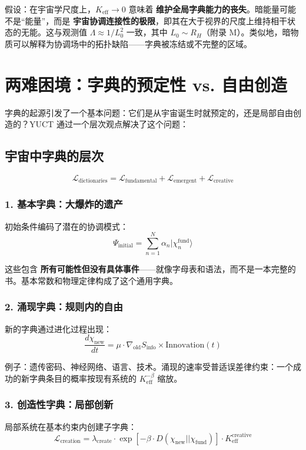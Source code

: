 \documentclass[12pt,a4paper]{article}
\newcommand{\eff}{\mathrm{eff}}
\newcommand{\Ke}{K_{\eff}}
\begin{document}
	假设：在宇宙学尺度上，$\Ke \to 0$ 意味着 \textbf{维护全局字典能力的丧失}。暗能量可能不是“能量”，而是 \textbf{宇宙协调连接性的极限}，即其在大于视界的尺度上维持相干状态的无能。这与观测值 $\Lambda \approx 1/L_0^2$ 一致，其中 $L_0 \sim R_H$（附录 M）。类似地，暗物质可以解释为协调场中的拓扑缺陷——字典被冻结或不完整的区域。
	
	\section{两难困境：字典的预定性 vs. 自由创造}
	
	字典的起源引发了一个基本问题：它们是从宇宙诞生时就预定的，还是局部自由创造的？YUCT 通过一个层次观点解决了这个问题：
	
	\subsection{宇宙中字典的层次}
	
	\[
	\mathcal{L}_{\text{dictionaries}} = \mathcal{L}_{\text{fundamental}} + \mathcal{L}_{\text{emergent}} + \mathcal{L}_{\text{creative}}
	\]
	
	\subsubsection{1. 基本字典：大爆炸的遗产}
	
	初始条件编码了潜在的协调模式：
	\[
	\Psi_{\text{initial}} = \sum_{n=1}^N \alpha_n |\chi_n^{\text{fund}}\rangle
	\]
	
	这些包含 \textbf{所有可能性但没有具体事件}——就像字母表和语法，而不是一本完整的书。基本常数和物理定律构成了这个通用字典。
	
	\subsubsection{2. 涌现字典：规则内的自由}
	
	新的字典通过进化过程出现：
	\[
	\frac{d\chi_{\text{new}}}{dt} = \mu \cdot \nabla_{\text{old}} S_{\text{info}} \times \text{Innovation}(t)
	\]
	
	例子：遗传密码、神经网络、语言、技术。涌现的速率受普适误差律约束：一个成功的新字典条目的概率按现有系统的 $\Ke^{-\beta}$ 缩放。
	
	\subsubsection{3. 创造性字典：局部创新}
	
	局部系统在基本约束内创建子字典：
	\[
	\mathcal{L}_{\text{creation}} = \lambda_{\text{create}} \cdot \exp\left[-\beta \cdot D(\chi_{\text{new}} || \chi_{\text{fund}})\right] \cdot \Ke^{\text{creative}}
	\]
	
\end{document}

